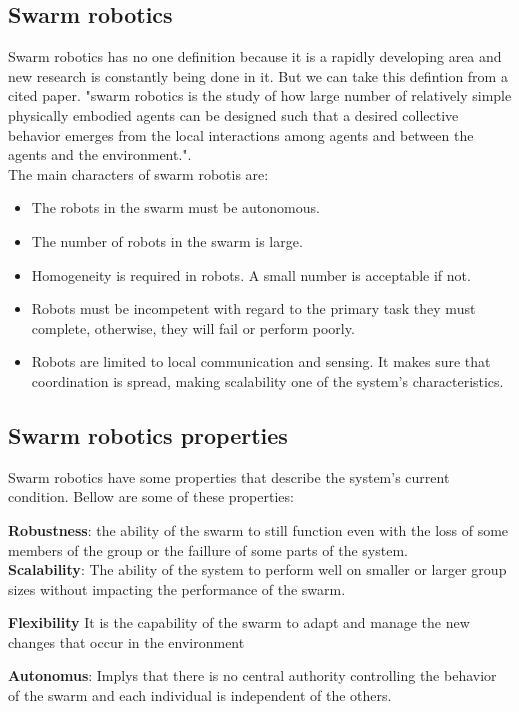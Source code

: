 \documentclass[12pt]{extarticle}
\begin{document}
 

\subsection{Swarm robotics}
Swarm robotics has no one definition because it is a rapidly developing area and new research is constantly being done in it. But we can take this defintion from a cited paper.
"swarm robotics is the study of how large number of relatively simple physically embodied agents can be
designed such that a desired collective behavior emerges from the local interactions among agents
and between the agents and the environment."\cite{csahin2005swarm}.\\

The main characters of swarm robotis are:
\begin{itemize}
  \item  The robots in the swarm must be autonomous. 
  \item The number of robots in the swarm is large.
  \item Homogeneity is required in robots. A small number is acceptable if not.
  \item Robots must be incompetent  with regard to the primary task they must complete, otherwise, they will fail or perform poorly.
  \item Robots are limited to local communication and sensing. It makes sure that coordination is spread, making scalability one of the system's characteristics.\cite{navarro2013introduction}
\end{itemize}


\subsection{Swarm robotics properties}
Swarm robotics have some properties that describe the system's current condition. Bellow are some of these properties:

\textbf{Robustness}: the ability of the swarm to  still function even with the loss of some members of the group or the faillure of some parts of the system.\\
\textbf{Scalability}: The ability of the system to perform well on smaller or larger group sizes without impacting the performance of the swarm.

\textbf{Flexibility} It is the capability of the swarm to adapt and manage the new changes that occur in the environment 

\textbf{Autonomus}: Implys that there is no central authority controlling the behavior of the swarm and each individual is independent of the others.
\end{document}
